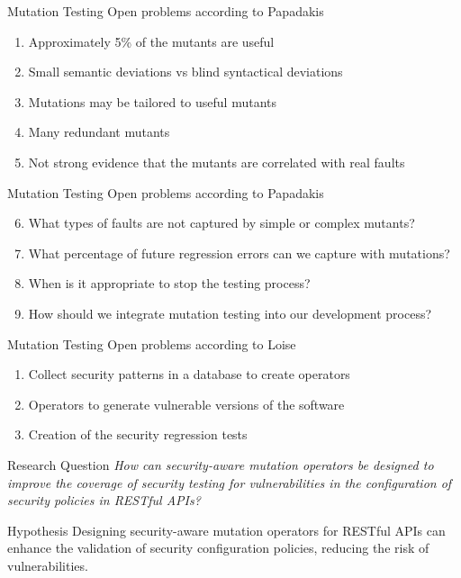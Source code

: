 \documentclass[12pt]{beamer}
\theoremstyle{remark}
\theoremstyle{definition}
\begin{document}
\begin{frame}{Mutation Testing}
Open problems according to Papadakis\cite{Papadakis2019}
\begin{enumerate}
    \item Approximately 5\% of the mutants are useful
    \item Small semantic deviations vs blind syntactical deviations
    \item Mutations may be tailored to useful mutants
    \item Many redundant mutants
    \item Not strong evidence that the mutants are correlated with real faults
\end{enumerate}
\end{frame}

\begin{frame}{Mutation Testing}
Open problems according to Papadakis\cite{Papadakis2019}
\begin{enumerate}
    \setcounter{enumi}{5}
    \item What types of faults are not captured by simple or complex mutants? 
    \item What percentage of future regression errors can we capture with mutations? 
    \item When is it appropriate to stop the testing process? 
    \item How should we integrate mutation testing into our development process?
\end{enumerate}
\end{frame}

\begin{frame}{Mutation Testing}
Open problems according to Loise\cite{Loise2017}
\begin{enumerate}
    \item Collect security patterns in a database to create operators
    \item Operators to generate vulnerable versions of the software
    \item Creation of the security regression tests
\end{enumerate}
\end{frame}

\begin{frame}[allowframebreaks]
\begin{block}{Research Question}
\textit{How can security-aware mutation operators be designed to improve the coverage of security testing for vulnerabilities in the configuration of security policies in RESTful APIs?}
\end{block}

\begin{block}{Hypothesis}
Designing security-aware mutation operators for RESTful APIs can enhance the validation of security configuration policies, reducing the risk of vulnerabilities.
\end{block}
\end{frame}
\end{document}
